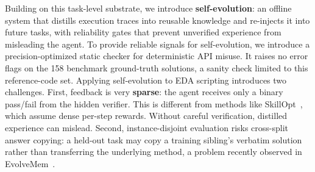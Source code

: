 Building on this task-level substrate, we introduce \textbf{self-evolution}: an offline system that distills execution traces into reusable knowledge and re-injects it into future tasks, with reliability gates that prevent unverified experience from misleading the agent. To provide reliable signals for self-evolution, we introduce a precision-optimized static checker for deterministic API misuse. It raises no error flags on the 158 benchmark ground-truth solutions, a sanity check limited to this reference-code set. Applying self-evolution to EDA scripting introduces two challenges. First, feedback is very \textbf{sparse}: the agent receives only a binary pass/fail from the hidden verifier. This is different from methods like SkillOpt~\cite{yang2026skillopt}, which assume dense per-step rewards. Without careful verification, distilled experience can mislead. Second, instance-disjoint evaluation risks cross-split answer copying: a held-out task may copy a training sibling's verbatim solution rather than transferring the underlying method, a problem recently observed in EvolveMem~\cite{evolvemem2026}.

